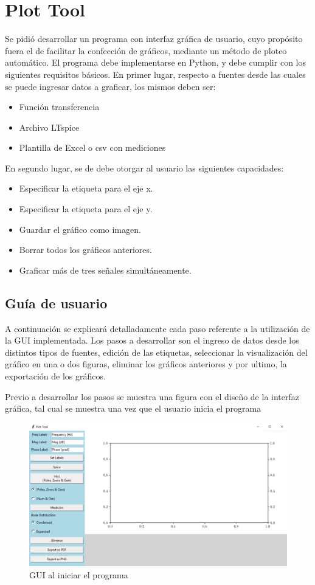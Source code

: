 
\section{Plot Tool}
Se pidió desarrollar un programa con interfaz gráfica de usuario, cuyo propósito fuera el de facilitar la confección de gráficos, mediante un método de ploteo automático. El programa debe implementarse en Python, y debe cumplir con los siguientes requisitos básicos. 
En primer lugar, respecto a fuentes desde las cuales se puede ingresar datos a graficar, los mismos deben ser:
\begin{itemize}
\item Función transferencia
\item Archivo LTspice
\item Plantilla de Excel o csv con mediciones
\end{itemize}
En segundo lugar, se de debe otorgar al usuario las siguientes capacidades:
\begin{itemize}
\item Especificar la etiqueta para el eje x.
\item Especificar la etiqueta para el eje y.
\item Guardar el gráfico como imagen.
\item Borrar todos los gráficos anteriores.
\item Graficar más de tres señales simultáneamente.
\end{itemize}

\subsection{Guía de usuario}
A continuación se explicará detalladamente cada paso referente a la utilización de la GUI implementada. Los pasos a desarrollar son el ingreso de datos desde los distintos tipos de fuentes, edición de las etiquetas, seleccionar la visualización del gráfico en una o dos figuras, eliminar los gráficos anteriores y por ultimo, la exportación de los gráficos.

Previo a desarrollar los pasos se muestra una figura con el diseño de la interfaz gráfica, tal cual se muestra una vez que el usuario inicia el programa

\begin{figure}[ht]
\centering
\includegraphics[scale=0.2]{resources/window.png}
\caption{GUI al iniciar el programa}
\label{fig:window}
\end{figure}

